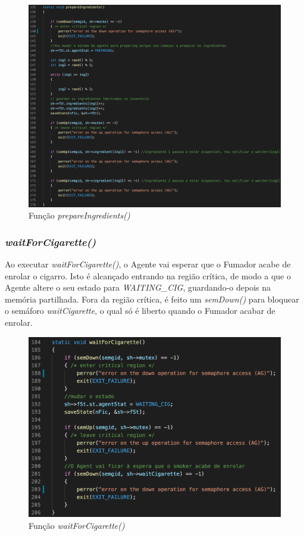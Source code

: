 \documentclass[10pt,portuguese]{article}
\begin{document}
\begin{figure}[!h]
    \centering
    \includegraphics[width=\textwidth]{images/implementation/prepareings.png}
    \caption{Função \textit{prepareIngredients()}}
\end{figure}

\subsubsection{\textit{waitForCigarette()}}

\par Ao executar \textit{waitForCigarette()}, o Agente vai esperar que o Fumador acabe de enrolar o cigarro. Isto é alcançado entrando na região crítica, de modo a que o Agente altere o seu estado para \textit{WAITING\_CIG}, guardando-o depois na memória partilhada. Fora da região crítica, é feito um \textit{semDown()} para bloquear o semáforo \textit{waitCigarette}, o qual só é liberto quando o Fumador acabar de enrolar.

\begin{figure}[!h]
    \centering
    \includegraphics[width=\textwidth]{images/implementation/waitcig.png}
    \caption{Função \textit{waitForCigarette()}}
\end{figure}
\end{document}
